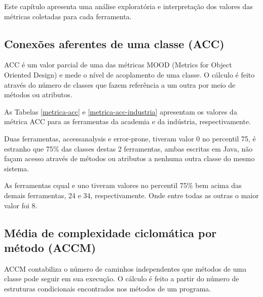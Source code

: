 {Este capítulo apresenta uma análise exploratória e interpretação dos valores das métricas coletadas para cada ferramenta.}
\label{analise-metricas}

\subsection{Conexões aferentes de uma classe (ACC)}

ACC é um valor parcial de uma das métricas MOOD (Metrics for Object Oriented
Design) \cite{Brito1994} e mede o nível de acoplamento de uma classe. O
cálculo é feito através do número de classes que fazem referência a um outra
por meio de métodos ou atributos.

As Tabelas \ref{metrica-acc} e \ref{metrica-acc-industria} apresentam os
valores da métrica ACC para as ferramentas da academia e da indústria,
respectivamente.


Duas ferramentas, accessanalysis e error-prone, tiveram valor 0 no percentil
75, é estranho que 75\% das classes destas 2 ferramentas, ambas escritas em
Java, não façam acesso através de métodos ou atributos a nenhuma outra classe
do mesmo sistema.


As ferramentas cqual e uno tiveram valores no percentil 75\% bem acima das
demais ferramentas, 24 e 34, respectivamente. Onde entre todas as outras o
maior valor foi 8.

\subsection{Média de complexidade ciclomática por método (ACCM)}

ACCM contabiliza o número de caminhos independentes que métodos de uma classe
pode seguir em sua execução. O cálculo é feito a partir do número de
estruturas condicionais encontrados nos métodos de um programa.


